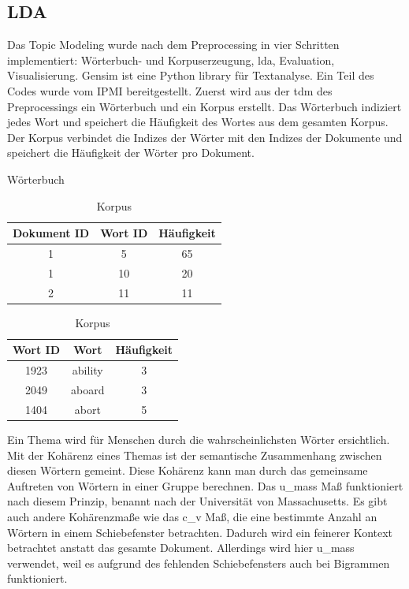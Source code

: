 \subsection{LDA}
Das Topic Modeling wurde nach dem Preprocessing in vier Schritten implementiert: Wörterbuch- und Korpuserzeugung, \ac{lda}, Evaluation, Visualisierung. Gensim ist eine Python library für Textanalyse. Ein Teil des Codes wurde vom IPMI bereitgestellt. Zuerst wird aus der \ac{tdm} des Preprocessings ein Wörterbuch und ein Korpus erstellt. Das Wörterbuch indiziert jedes Wort und speichert die Häufigkeit des Wortes aus dem gesamten Korpus. Der Korpus verbindet die Indizes der Wörter mit den Indizes der Dokumente und speichert die Häufigkeit der Wörter pro Dokument.

\begin{table}[!htb]
	\RawFloats
	\begin{minipage}{.5\linewidth}
		\caption{Wörterbuch}
		\centering
		\begin{tabular}{|c|c|c|}
			\hline 
			Dokument ID & Wort ID & Häufigkeit \\ 
			\hline 
			1& 5 &65  \\ 
			\hline 
			1& 10 & 20 \\ 
			\hline 
			2& 11 & 11 \\ 
			\hline 
		\end{tabular} 
	\end{minipage}%
	\begin{minipage}{.5\linewidth}
		\centering
		\caption{Korpus}
		\begin{tabular}{|c|c|c|}
			\hline 
			Wort ID & Wort & Häufigkeit \\ 
			\hline 
			1923& ability & 3 \\ 
			\hline 
			2049& aboard &3  \\ 
			\hline 
			1404& abort & 5 \\ 
			\hline 
		\end{tabular} 
	\end{minipage} 
\end{table}

Ein Thema wird für Menschen durch die wahrscheinlichsten Wörter ersichtlich. \parencite[vgl.][S. 265-266]{mimno2011optimizing} Mit der Kohärenz eines Themas ist der semantische Zusammenhang zwischen diesen Wörtern gemeint. Diese Kohärenz kann man durch das gemeinsame Auftreten von Wörtern in einer Gruppe berechnen. Das u\_mass Maß funktioniert nach diesem Prinzip, benannt nach der Universität von Massachusetts. Es gibt auch andere Kohärenzmaße wie das c\_v Maß, die eine bestimmte Anzahl an Wörtern in einem Schiebefenster betrachten. Dadurch wird ein feinerer Kontext betrachtet anstatt das gesamte Dokument. Allerdings wird hier u\_mass verwendet, weil es aufgrund des fehlenden Schiebefensters auch bei Bigrammen funktioniert.

